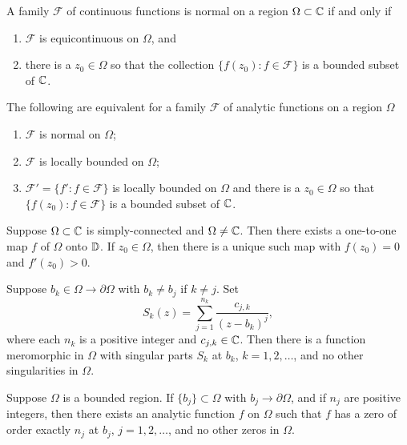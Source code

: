 \documentclass[12pt]{article}
\begin{document}
\begin{sats}
    A family $\mathcal{F}$ of continuous functions is normal on a region $\Omega\subset\mathbb{C}$ if and only if
    \begin{enumerate}[label=(\roman*)]
        \item $\mathcal{F}$ is equicontinuous on $\Omega$, and
        \item there is a $z_0\in \Omega$ so that the collection $\{f(z_0):f\in\mathcal{F}\}$ is a bounded subset of $\mathbb{C}$.
    \end{enumerate}
\end{sats}

\begin{sats}
    The following are equivalent for a family $\mathcal{F}$ of analytic functions on a region $\Omega$
    \begin{enumerate}[label=(\roman*)]
        \item $\mathcal{F}$ is normal on $\Omega$;
        \item $\mathcal{F}$ is locally bounded on $\Omega$;
        \item $\mathcal{F}'=\{f':f\in\mathcal{F}\}$ is locally bounded on $\Omega$ and there is a $z_0\in\Omega$ so that $\{f(z_0):f\in\mathcal{F}\}$ is a bounded subset of $\mathbb{C}$. 
    \end{enumerate}
\end{sats}

\begin{sats}
    Suppose $\Omega\subset\mathbb{C}$ is simply-connected and $\Omega\neq\mathbb{C}$. Then there exists a one-to-one map $f$ of $\Omega$ onto $\mathbb{D}$. If $z_0\in\Omega$, then there is a unique such map with $f(z_0)=0$ and $f'(z_0)>0$.
\end{sats}

\begin{sats}
    Suppose $b_k\in\Omega\to\partial\Omega$ with $b_k\neq b_j$ if $k\neq j$. Set 
    \begin{equation*}
        S_k(z)=\sum_{j=1}^{n_k}\frac{c_{j,k}}{(z-b_k)^j},
    \end{equation*}
    where each $n_k$ is a positive integer and $c_{j,k}\in\mathbb{C}$. Then there is a function meromorphic in $\Omega$ with singular parts $S_k$ at $b_k$, $k=1,2,\dots$, and no other singularities in $\Omega$. 
\end{sats}

\begin{sats}
    Suppose $\Omega$ is a bounded region. If $\{b_j\}\subset\Omega$ with $b_j\to\partial\Omega$, and if $n_j$ are positive integers, then there exists an analytic function $f$ on $\Omega$ such that $f$ has a zero of order exactly $n_j$ at $b_j$, $j=1,2,\dots$, and no other zeros in $\Omega$.
\end{sats}
\end{document}

